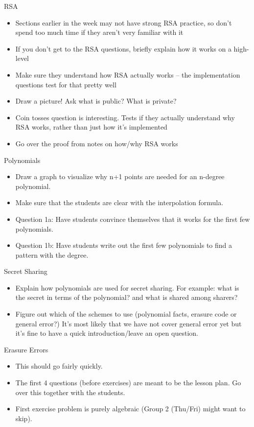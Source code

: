 \documentclass{exam}
\begin{document}
\begin{questions}
\item RSA
	\begin{itemize}
		\item Sections earlier in the week may not have strong RSA practice, so don’t spend too much time if they aren’t very familiar with it
		\item If you don’t get to the RSA questions, briefly explain how it works on a high-level
		\item Make sure they understand how RSA actually works – the implementation questions test for that pretty well
		\item Draw a picture! Ask what is public? What is private?
		\item Coin tosses question is interesting. Tests if they actually understand why RSA works, rather than just how it’s implemented
		\item Go over the proof from notes on how/why RSA works
	\end{itemize}


\item Polynomials
	\begin{itemize}
		\item Draw a graph to visualize why n+1 points are needed for an n-degree polynomial.
		\item Make sure that the students are clear with the interpolation formula.
		\item Question 1a: Have students convince themselves that it works for the first few polynomials.
		\item Question 1b: Have students write out the first few polynomials to find a pattern with the degree.
	\end{itemize}

\item Secret Sharing
	\begin{itemize}
		\item Explain how polynomials are used for secret sharing. For example: what is the secret in terms of the polynomial? and what is shared among sharers?
		\item Figure out which of the schemes to use (polynomial facts, erasure code or general error?) It's most likely that we have not cover general error yet but it's fine to have a quick introduction/leave an open question.
	\end{itemize}


\item Erasure Errors
	\begin{itemize}
		\item This should go fairly quickly.
		\item The first 4 questions (before exercises) are meant to be the lesson plan. Go over this together with the students.
		\item First exercise problem is purely algebraic (Group 2 (Thu/Fri) might want to skip).
	\end{itemize}

\end{questions}
\end{document}
